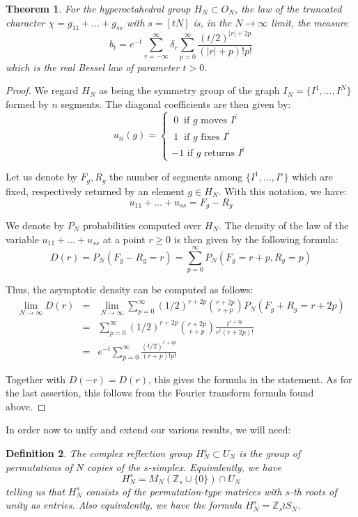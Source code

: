 \documentclass[12pt]{amsbook}
\newtheorem{theorem}{Theorem}[chapter]
\newtheorem{definition}[theorem]{Definition}
\begin{document}
\begin{theorem}
For the hyperoctahedral group $H_N\subset O_N$, the law of the truncated character $\chi=g_{11}+\ldots +g_{ss}$ with $s=[tN]$ is, in the $N\to\infty$ limit, the measure
$$b_t=e^{-t}\sum_{r=-\infty}^\infty\delta_r\sum_{p=0}^\infty \frac{(t/2)^{|r|+2p}}{(|r|+p)!p!}$$
which is the real Bessel law of parameter $t>0$.
\end{theorem}

\begin{proof}
We regard $H_N$ as being the symmetry group of the graph $I_N=\{I^1,\ldots ,I^N\}$ formed by $n$ segments. The diagonal coefficients are then given by:
$$u_{ii}(g)=\begin{cases}
\ 0\ \mbox{ if $g$ moves $I^i$}\\
\ 1\ \mbox{ if $g$ fixes $I^i$}\\
-1\mbox{ if $g$ returns $I^i$}
\end{cases}$$

Let us denote by $F_g,R_g$ the number of segments among $\{I^1,\ldots ,I^s\}$ which are fixed, respectively returned by an element $g\in H_N$. With this notation, we have:
$$u_{11}+\ldots+u_{ss}=F_g-R_g$$

We denote by $P_N$ probabilities computed over $H_N$. The density of the law of the variable $u_{11}+\ldots+u_{ss}$ at a point $r\geq 0$ is then given by the following formula:
$$D(r)
=P_N(F_g-R_g=r)
=\sum_{p=0}^\infty P_N(F_g=r+p,R_g=p)$$

Thus, the asymptotic density can be computed as follows:
\begin{eqnarray*}
\lim_{N\to\infty}D(r)
&=&\lim_{N\to\infty}\sum_{p=0}^\infty(1/2)^{r+2p}\binom{r+2p}{r+p}P_N(F_g+R_g=r+2p)\\
&=&\sum_{p=0}^\infty(1/2)^{r+2p}\binom{r+2p}{r+p}\frac{t^{r+2p}}{e^t(r+2p)!}\\
&=&e^{-t}\sum_{p=0}^\infty\frac{(t/2)^{r+2p}}{(r+p)!p!}
\end{eqnarray*}

Together with $D(-r)=D(r)$, this gives the formula in the statement. As for the last assertion, this follows from the Fourier transform formula found above.
\end{proof}

In order now to unify and extend our various results, we will need:


\begin{definition}
The complex reflection group $H_N^s\subset U_N$ is the group of permutations of $N$ copies of the $s$-simplex. Equivalently, we have
$$H_N^s=M_N(\mathbb Z_s\cup\{0\})\cap U_N$$
telling us that $H_N^s$ consists of the permutation-type matrices with $s$-th roots of unity as entries. Also equivalently, we have the formula $H_N^s=\mathbb Z_s\wr S_N$.
\end{definition}
\end{document}
